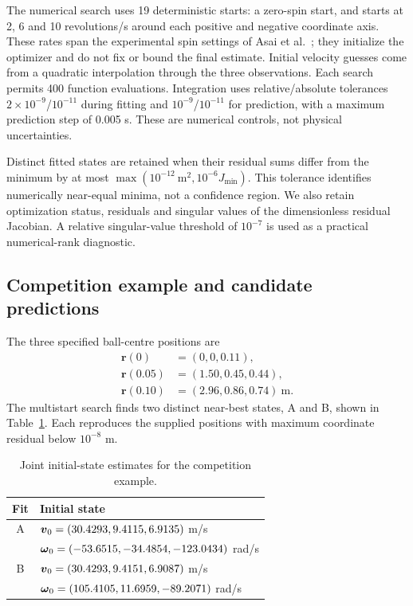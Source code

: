 \documentclass[12pt,letterpaper]{article}
\begin{document}
The numerical search uses 19 deterministic starts: a zero-spin start, and starts at 2, 6 and 10 revolutions/s around each positive and negative coordinate axis. These rates span the experimental spin settings of Asai et al.\ \cite{asai2007}; they initialize the optimizer and do not fix or bound the final estimate. Initial velocity guesses come from a quadratic interpolation through the three observations. Each search permits 400 function evaluations. Integration uses relative/absolute tolerances $2\times10^{-9}$/$10^{-11}$ during fitting and $10^{-9}$/$10^{-11}$ for prediction, with a maximum prediction step of 0.005 s. These are numerical controls, not physical uncertainties.

Distinct fitted states are retained when their residual sums differ from the minimum by at most $\max(10^{-12}\ \mathrm{m}^2,10^{-6}J_{\min})$. This tolerance identifies numerically near-equal minima, not a confidence region. We also retain optimization status, residuals and singular values of the dimensionless residual Jacobian. A relative singular-value threshold of $10^{-7}$ is used as a practical numerical-rank diagnostic.

\subsection{Competition example and candidate predictions}\label{sec:example}
The three specified ball-centre positions are
\begin{equation}
\begin{aligned}
\boldsymbol r(0)&=(0,0,0.11),\\
\boldsymbol r(0.05)&=(1.50,0.45,0.44),\\
\boldsymbol r(0.10)&=(2.96,0.86,0.74)\ \mathrm{m}.
\end{aligned}
\end{equation}
The multistart search finds two distinct near-best states, A and B, shown in Table~\ref{tab:fit-states}. Each reproduces the supplied positions with maximum coordinate residual below $10^{-8}$ m.
\begin{table}[H]\centering\small
\caption{Joint initial-state estimates for the competition example.}\label{tab:fit-states}
\begin{tabular}{cl}\toprule
Fit & Initial state\\\midrule
A & $\boldsymbol v_0=(30.4293, 9.4115, 6.9135)$ m/s\\
  & $\boldsymbol\omega_0=(-53.6515, -34.4854, -123.0434)$ rad/s\\
B & $\boldsymbol v_0=(30.4293, 9.4151, 6.9087)$ m/s\\
  & $\boldsymbol\omega_0=(105.4105, 11.6959, -89.2071)$ rad/s\\\bottomrule
\end{tabular}\end{table}
\end{document}
